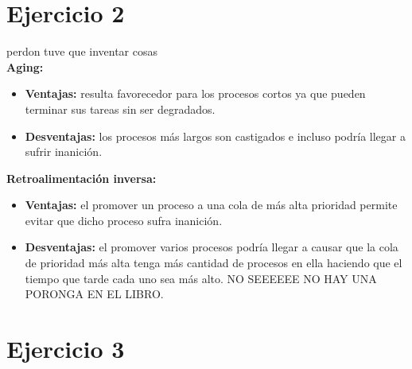 \documentclass[11pt]{article}
\begin{document}
\section*{Ejercicio 2}

perdon tuve que inventar cosas \\

\textbf{Aging:}

\begin{itemize}
    \item \textbf{Ventajas:} resulta favorecedor para los procesos cortos ya que
          pueden terminar sus tareas sin ser degradados.
    \item \textbf{Desventajas:} los procesos más largos son castigados e incluso podría llegar
          a sufrir inanición.
\end{itemize}

\textbf{Retroalimentación inversa:}

\begin{itemize}
    \item \textbf{Ventajas:} el promover un proceso a una cola de más alta prioridad
          permite evitar que dicho proceso sufra inanición.
    \item \textbf{Desventajas:} el promover varios procesos podría llegar a causar
          que la cola de prioridad más alta tenga más cantidad de procesos en ella
          haciendo que el tiempo que tarde cada uno sea más alto. NO SEEEEEE NO HAY
          UNA PORONGA EN EL LIBRO.
\end{itemize}

\section*{Ejercicio 3}
\end{document}
